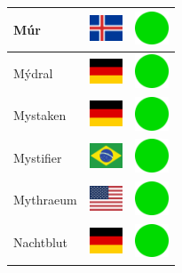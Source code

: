 \documentclass[12pt, a4paper, twoside]{report}
\begin{document}
\begin{center}
\begin{longtable}{|p{5cm}|p{2cm}|p{2cm}|}
 Múr                                                        & \includegraphics[width=1cm]{../img/flags/is} &   \includegraphics[width=1cm]{../likes/y} \\ \hline
 Mýdral                                                     & \includegraphics[width=1cm]{../img/flags/de} &   \includegraphics[width=1cm]{../likes/y} \\ \hline
 Mystaken                                                   & \includegraphics[width=1cm]{../img/flags/de} &   \includegraphics[width=1cm]{../likes/y} \\ \hline
 Mystifier                                                  & \includegraphics[width=1cm]{../img/flags/br} &   \includegraphics[width=1cm]{../likes/y} \\ \hline
 Mythraeum                                                  & \includegraphics[width=1cm]{../img/flags/us} &   \includegraphics[width=1cm]{../likes/y} \\ \hline
 Nachtblut                                                  & \includegraphics[width=1cm]{../img/flags/de} &   \includegraphics[width=1cm]{../likes/y} \\ \hline

\end{longtable}
\end{center}
\end{document}
